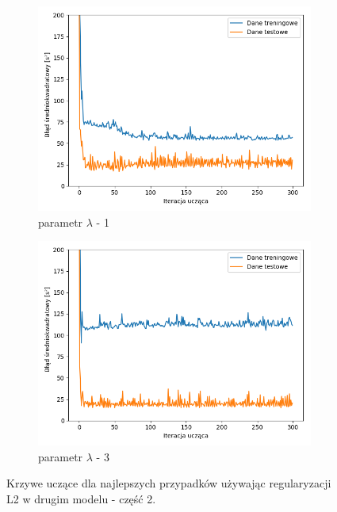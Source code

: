 \documentclass[12pt]{aghdpl}
\begin{document}
		\begin{figure}[h]
			\centering
		 	\begin{subfigure}{.8\linewidth}
		 		\includegraphics[width =\linewidth]{wykresy/6_regularyzacja/l2/regularyzacja_1_wykres_uczenia.png}
		 		\caption{parametr $\lambda$ - 1}
		 	\end{subfigure}
		 	\begin{subfigure}{.8\linewidth}
		 		\includegraphics[width =\linewidth]{wykresy/6_regularyzacja/l2/regularyzacja_3_wykres_uczenia.png}
		 		\caption{parametr $\lambda$ - 3}
		 	\end{subfigure}
	 	
 			\caption{Krzywe uczące dla najlepszych przypadków używając regularyzacji L2 w drugim modelu - część 2.}
			\label{fig: drugi_model_przy_regularyzacji_l2_wykresy_uczenia_2}
		\end{figure}
		
\end{document}
